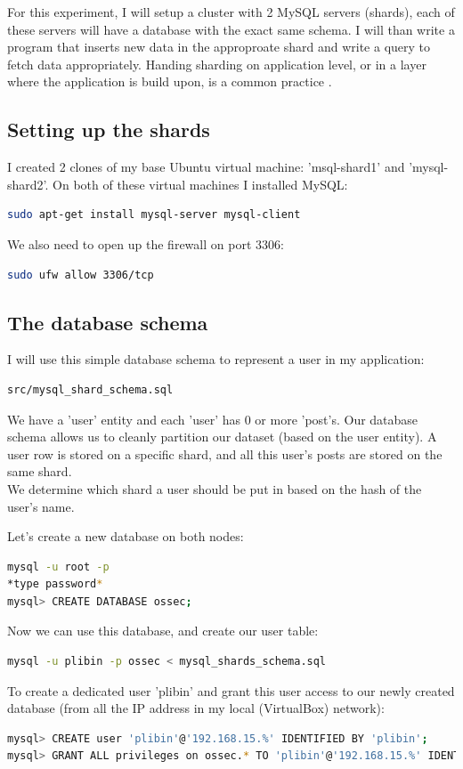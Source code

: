 \documentclass[12pt]{report}
\begin{document}
For this experiment, I will setup a cluster with 2 MySQL servers (shards), each
of these servers will have a database with the exact same schema. I will
than write a program that inserts new data in the approproate shard
and write a query to fetch data appropriately.
Handing sharding on application level, or in a layer where the
application is build upon, is a common practice
\cite{tumblr_sharding}. 

\subsection{Setting up the shards}
I created 2 clones of my base Ubuntu virtual machine: 'msql-shard1'
and 'mysql-shard2'. 
On both of these virtual machines I installed MySQL:
\begin{lstlisting}[language=bash]
sudo apt-get install mysql-server mysql-client
\end{lstlisting}

We also need to open up the firewall on port 3306:
\begin{lstlisting}[language=bash]
sudo ufw allow 3306/tcp
\end{lstlisting}

\subsection{The database schema}
I will use this simple database schema to represent a user in my
application:
\begin{lstlisting}[language=bash]
src/mysql_shard_schema.sql
\end{lstlisting}
We have a 'user' entity and each 'user' has 0 or more 'post's. Our
database schema allows us to cleanly partition our dataset (based on
the user entity). A user row is stored on a specific shard, and all
this user's posts are stored on the same shard.\\
We determine which shard a user should be put in based on the hash of
the user's name.

Let's create a new database on both nodes:
\begin{lstlisting}[language=bash]
mysql -u root -p
*type password*
mysql> CREATE DATABASE ossec;
\end{lstlisting}
Now we can use this database, and create our user table:
\begin{lstlisting}[language=bash]
mysql -u plibin -p ossec < mysql_shards_schema.sql
\end{lstlisting}
To create a dedicated user 'plibin' and grant this user access to our
newly created database (from all the IP address in my local
(VirtualBox) network):
\begin{lstlisting}[language=bash]
mysql> CREATE user 'plibin'@'192.168.15.%' IDENTIFIED BY 'plibin';
mysql> GRANT ALL privileges on ossec.* TO 'plibin'@'192.168.15.%' IDENTIFIED BY 'plibin';
\end{lstlisting}
\end{document}
